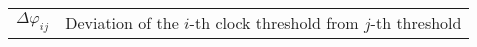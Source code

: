 \begin{frontmattersection}[Symbols]
\begin{longtable}{ll}
$\Delta \varphi_{ij}$ & Deviation of the $i$-th clock threshold from $j$-th threshold \\
\end{longtable}
\end{frontmattersection} 